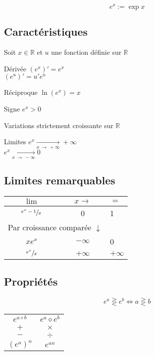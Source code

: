 \documentclass{article}
\newcommand{\R}{\mathds{R}}
\newcommand{\oo}{\infty}
\newcommand{\twoColsNB}[1]{\multicolumn{2}{c}{#1}}
\newcommand{\goesto}[2]{\xrightarrow[#1\:\to\:#2]{}}
\newcommand{\placeholder}{\diamond}
\newenvironment{descriptiona}{\begin{description}[leftmargin=!,labelwidth=\widthof{\bfseries The longest label}]}{\end{description}}
\begin{document}
\[e^x := \exp{x}\]

\subsection{Caractéristiques}

Soit $x \in \R$ et $u$ une fonction définie sur $\R$

\begin{descriptiona}
\item[Dérivée] $(e^x)' = e^x$\\$(e^u)' = u'e^u$
\item[Réciproque] $\ln(e^x) = x$
\item[Signe] $e^x > 0$
\item[Variations] strictement croissante sur $\R$
\item[Limites] $e^x \goesto{x}{+\oo} +\oo $\\$ e^x \goesto{x}{-\oo} 0$
\end{descriptiona}

\subsection{Limites remarquables}
\begin{table}[h]
    \centering
    \begin{tabular}{cc|l}
        $\lim$ & $x\to$ & $=$ \\\hline\hline
        $\sfrac{e^x-1}{x}$ & 0 & 1 \\\hline
        \twoColsNB{Par croissance comparée $\downarrow$} & \\\hline
        $xe^x$ & $-\oo$ & 0 \\\hline
        $\sfrac{e^x}{x}$ & $+\oo$ & $+\oo$
    \end{tabular}
\end{table}

\label{proprietes_exp}
\subsection{Propriétés}

\[e^a \gtreqless e^b \iff a \gtreqless b\]

\begin{table}[h!]
    \centering
    \begin{tabular}{c|c}
        $e^{a\placeholder b}$ & $e^ a \placeholder e^ b $ \\
        $+$ & $\times$ \\
        $-$ & $\div$ \\\hline
        $(e^a)^n$ &  $e^{an}$ \\
    \end{tabular}
\end{table}
\end{document}

